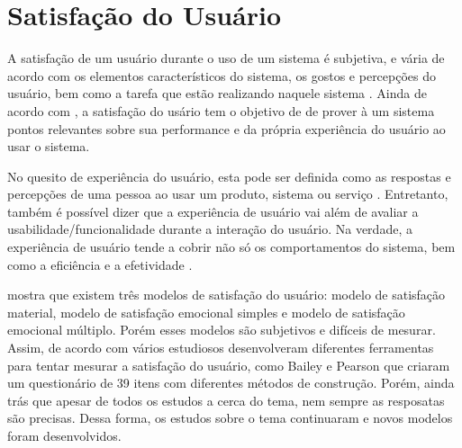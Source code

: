 
\section{Satisfação do Usuário}\label{sec:expus}
A satisfação de um usuário durante o uso de um sistema é subjetiva, e vária de acordo com os elementos característicos do
sistema, os gostos e percepções do usuário, bem como a tarefa que estão realizando naquele sistema \cite{griffiths2007user}.
Ainda de acordo com , a satisfação do usário tem o objetivo de de prover à um sistema pontos 
relevantes sobre sua performance e da própria experiência do usuário ao usar o sistema. 

No quesito de experiência do usuário, esta pode ser definida como as respostas e percepções de uma pessoa ao usar um produto, 
sistema ou serviço \cite{iso9241-210}. Entretanto, também é possível dizer que a experiência de usuário vai além de avaliar a 
usabilidade/funcionalidade durante
a interação do usuário. Na verdade, a experiência de usuário tende a cobrir não só os comportamentos do sistema, bem como a 
eficiência e a efetividade \cite{allam2013user}. 

 mostra que existem três modelos de satisfação do usuário: modelo de satisfação material, modelo de satisfação emocional simples e 
modelo de satisfação emocional múltiplo. Porém esses modelos são subjetivos e difíceis de mesurar. 
Assim, de acordo com  vários estudiosos desenvolveram diferentes ferramentas para tentar mesurar 
a satisfação
do usuário, como Bailey e Pearson que criaram um questionário de 39 itens com diferentes métodos de construção. Porém, 
 ainda trás que apesar de todos os estudos a cerca do tema, nem sempre as resposatas são
precisas. Dessa forma, os estudos sobre o tema continuaram e novos modelos foram desenvolvidos.

